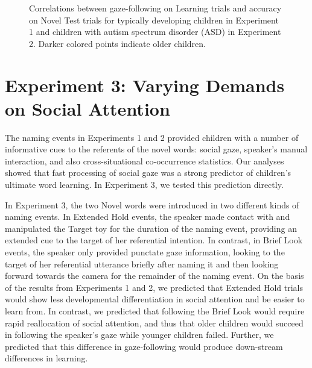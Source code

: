 \documentclass{pnastwo}
\begin{document}
\begin{article}
\begin{figure}[tb]
	\caption{Correlations between gaze-following on Learning trials and accuracy on Novel Test trials for typically developing children in Experiment 1 and children with autism spectrum disorder (ASD) in Experiment 2. Darker colored points indicate older children.}
	\label{fig:corr_plot}
\end{figure}

\section{Experiment 3: Varying Demands on Social Attention}

The naming events in Experiments 1 and 2 provided children with a number of informative cues to the referents of the novel words: social gaze, speaker's manual interaction, and also cross-situational co-occurrence statistics. Our analyses showed that fast processing of social gaze was a strong predictor of children's ultimate word learning. In Experiment 3, we tested this prediction directly.

In Experiment 3, the two Novel words were introduced in two different kinds of naming events. In Extended Hold events, the speaker made contact with and manipulated the Target toy for the duration of the naming event, providing an extended cue to the target of her referential intention. In contrast, in Brief Look events, the speaker only provided punctate gaze information, looking to the target of her referential utterance briefly after naming it and then looking forward towards the camera for the remainder of the naming event. On the basis of the results from Experiments 1 and 2, we predicted that Extended Hold trials would show less developmental differentiation in social attention and be easier to learn from. In contrast, we predicted that following the Brief Look would require rapid reallocation of social attention, and thus that older children would succeed in following the speaker's gaze while younger children failed. Further, we predicted that this difference in gaze-following would produce down-stream differences in learning.


\end{article}
\end{document}
